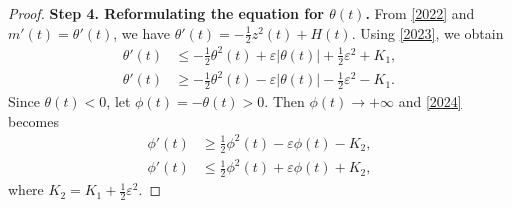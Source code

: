\documentclass[10pt,a4paper]{amsart}
\begin{document}
\begin{proof}
\noindent\textbf{Step 4. Reformulating the equation for $\theta(t)$.}
From \eqref{2022} and $m'(t) = \theta'(t)$, we have
$\theta'(t) = -\frac{1}{2} z^2(t) + H(t).$
Using \eqref{2023}, we obtain
\begin{align}
\theta'(t) &\leq -\frac{1}{2}\theta^2(t) + \varepsilon |\theta(t)| + \frac{1}{2} \varepsilon^2 + K_{1},\nonumber\\
\theta'(t) &\geq -\frac{1}{2}\theta^2(t) - \varepsilon |\theta(t)| -\frac{1}{2} \varepsilon^2 - K_{1}.
\label{2024}
\end{align}
Since $\theta(t) < 0$, let $\phi(t) = -\theta(t) > 0$. Then $\phi(t) \to +\infty$ and \eqref{2024} becomes
\begin{align}
\phi'(t) &\geq \frac{1}{2} \phi^2(t) - \varepsilon \phi(t) - K_2,\nonumber\\
\phi'(t) &\leq \frac{1}{2}\phi^2(t) + \varepsilon \phi(t) + K_2,
\label{2025}
\end{align}
where $K_2 = K_1 + \frac{1}{2} \varepsilon^2$.










\end{proof}
\end{document}
